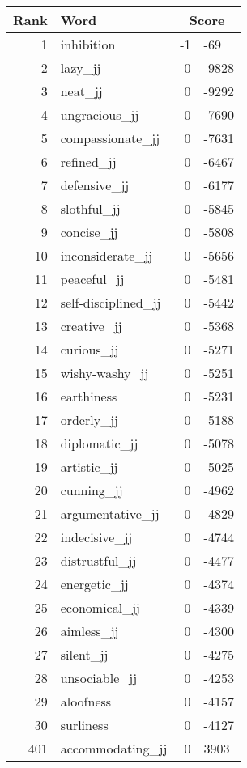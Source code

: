 \begin{longtable}[!htbp]{| rlr@{.}l |}
    \hline
    \textbf{Rank} & \textbf{Word} & \multicolumn{2}{c|}{\textbf{Score}} \\
    \hline
    \endhead
    1 & inhibition & -1 & -69 \\
    2 & lazy\_jj & 0 & -9828 \\
    3 & neat\_jj & 0 & -9292 \\
    4 & ungracious\_jj & 0 & -7690 \\
    5 & compassionate\_jj & 0 & -7631 \\
    6 & refined\_jj & 0 & -6467 \\
    7 & defensive\_jj & 0 & -6177 \\
    8 & slothful\_jj & 0 & -5845 \\
    9 & concise\_jj & 0 & -5808 \\
    10 & inconsiderate\_jj & 0 & -5656 \\
    11 & peaceful\_jj & 0 & -5481 \\
    12 & self-disciplined\_jj & 0 & -5442 \\
    13 & creative\_jj & 0 & -5368 \\
    14 & curious\_jj & 0 & -5271 \\
    15 & wishy-washy\_jj & 0 & -5251 \\
    16 & earthiness & 0 & -5231 \\
    17 & orderly\_jj & 0 & -5188 \\
    18 & diplomatic\_jj & 0 & -5078 \\
    19 & artistic\_jj & 0 & -5025 \\
    20 & cunning\_jj & 0 & -4962 \\
    21 & argumentative\_jj & 0 & -4829 \\
    22 & indecisive\_jj & 0 & -4744 \\
    23 & distrustful\_jj & 0 & -4477 \\
    24 & energetic\_jj & 0 & -4374 \\
    25 & economical\_jj & 0 & -4339 \\
    26 & aimless\_jj & 0 & -4300 \\
    27 & silent\_jj & 0 & -4275 \\
    28 & unsociable\_jj & 0 & -4253 \\
    29 & aloofness & 0 & -4157 \\
    30 & surliness & 0 & -4127 \\
    401 & accommodating\_jj & 0 & 3903 \\

\end{longtable}
